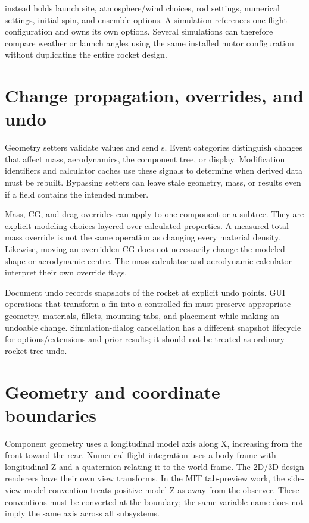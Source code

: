  instead holds launch site, atmosphere/wind choices, rod settings, numerical settings, initial spin, and ensemble options. A simulation references one flight configuration and owns its own options. Several simulations can therefore compare weather or launch angles using the same installed motor configuration without duplicating the entire rocket design.

\section{Change propagation, overrides, and undo}
Geometry setters validate values and send s. Event categories distinguish changes that affect mass, aerodynamics, the component tree, or display. Modification identifiers and calculator caches use these signals to determine when derived data must be rebuilt. Bypassing setters can leave stale geometry, mass, or results even if a field contains the intended number.

Mass, CG, and drag overrides can apply to one component or a subtree. They are explicit modeling choices layered over calculated properties. A measured total mass override is not the same operation as changing every material density. Likewise, moving an overridden CG does not necessarily change the modeled shape or aerodynamic centre. The mass calculator and aerodynamic calculator interpret their own override flags.

Document undo records snapshots of the rocket at explicit undo points. GUI operations that transform a fin into a controlled fin must preserve appropriate geometry, materials, fillets, mounting tabs, and placement while making an undoable change. Simulation-dialog cancellation has a different snapshot lifecycle for options/extensions and prior results; it should not be treated as ordinary rocket-tree undo.

\section{Geometry and coordinate boundaries}
Component geometry uses a longitudinal model axis along X, increasing from the front toward the rear. Numerical flight integration uses a body frame with longitudinal Z and a quaternion relating it to the world frame. The 2D/3D design renderers have their own view transforms. In the MIT tab-preview work, the side-view model convention treats positive model Z as away from the observer. These conventions must be converted at the boundary; the same variable name does not imply the same axis across all subsystems.

